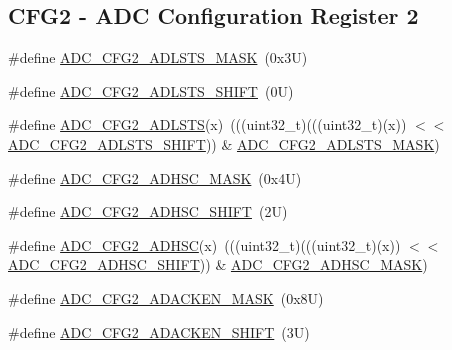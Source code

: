 \subsection*{C\+F\+G2 -\/ A\+DC Configuration Register 2}
\begin{DoxyCompactItemize}
\item 
\#define \mbox{\hyperlink{group___a_d_c___register___masks_ga99f0b4983922eca1e6ed86d053fe41db}{A\+D\+C\+\_\+\+C\+F\+G2\+\_\+\+A\+D\+L\+S\+T\+S\+\_\+\+M\+A\+SK}}~(0x3\+U)
\item 
\#define \mbox{\hyperlink{group___a_d_c___register___masks_ga8d39dceb9fa2550294f0623cc1fbc3f3}{A\+D\+C\+\_\+\+C\+F\+G2\+\_\+\+A\+D\+L\+S\+T\+S\+\_\+\+S\+H\+I\+FT}}~(0\+U)
\item 
\#define \mbox{\hyperlink{group___a_d_c___register___masks_gae23653c06f0dfe00b27a15ef15138c8e}{A\+D\+C\+\_\+\+C\+F\+G2\+\_\+\+A\+D\+L\+S\+TS}}(x)~(((uint32\+\_\+t)(((uint32\+\_\+t)(x)) $<$$<$ \mbox{\hyperlink{group___a_d_c___register___masks_ga8d39dceb9fa2550294f0623cc1fbc3f3}{A\+D\+C\+\_\+\+C\+F\+G2\+\_\+\+A\+D\+L\+S\+T\+S\+\_\+\+S\+H\+I\+FT}})) \& \mbox{\hyperlink{group___a_d_c___register___masks_ga99f0b4983922eca1e6ed86d053fe41db}{A\+D\+C\+\_\+\+C\+F\+G2\+\_\+\+A\+D\+L\+S\+T\+S\+\_\+\+M\+A\+SK}})
\item 
\#define \mbox{\hyperlink{group___a_d_c___register___masks_ga73cb928c5cacb18e02a3f0d67dcf1e6f}{A\+D\+C\+\_\+\+C\+F\+G2\+\_\+\+A\+D\+H\+S\+C\+\_\+\+M\+A\+SK}}~(0x4\+U)
\item 
\#define \mbox{\hyperlink{group___a_d_c___register___masks_ga447389268d77124eb2012fd98bfe07ce}{A\+D\+C\+\_\+\+C\+F\+G2\+\_\+\+A\+D\+H\+S\+C\+\_\+\+S\+H\+I\+FT}}~(2\+U)
\item 
\#define \mbox{\hyperlink{group___a_d_c___register___masks_ga450ab5053af7a32f369bc1436b35d7f5}{A\+D\+C\+\_\+\+C\+F\+G2\+\_\+\+A\+D\+H\+SC}}(x)~(((uint32\+\_\+t)(((uint32\+\_\+t)(x)) $<$$<$ \mbox{\hyperlink{group___a_d_c___register___masks_ga447389268d77124eb2012fd98bfe07ce}{A\+D\+C\+\_\+\+C\+F\+G2\+\_\+\+A\+D\+H\+S\+C\+\_\+\+S\+H\+I\+FT}})) \& \mbox{\hyperlink{group___a_d_c___register___masks_ga73cb928c5cacb18e02a3f0d67dcf1e6f}{A\+D\+C\+\_\+\+C\+F\+G2\+\_\+\+A\+D\+H\+S\+C\+\_\+\+M\+A\+SK}})
\item 
\#define \mbox{\hyperlink{group___a_d_c___register___masks_ga1158034a83b78e238c3f8ca481ab9b27}{A\+D\+C\+\_\+\+C\+F\+G2\+\_\+\+A\+D\+A\+C\+K\+E\+N\+\_\+\+M\+A\+SK}}~(0x8\+U)
\item 
\#define \mbox{\hyperlink{group___a_d_c___register___masks_gad009e6fe93b9f44fb0f79cd479d8bb1a}{A\+D\+C\+\_\+\+C\+F\+G2\+\_\+\+A\+D\+A\+C\+K\+E\+N\+\_\+\+S\+H\+I\+FT}}~(3\+U)

\end{DoxyCompactItemize}
